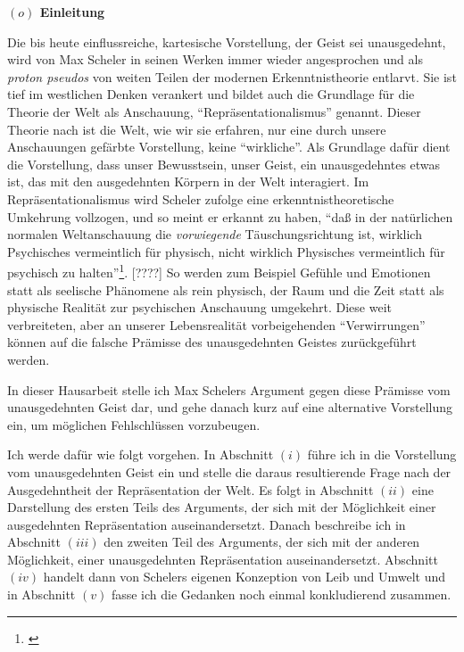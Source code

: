 \documentclass[a4paper, 12pt]{article}
\begin{document}
\begin{onehalfspace} 

\noindent\textbf{$(o)$ Einleitung}

\noindent Die bis heute einflussreiche, kartesische Vorstellung, der Geist sei unausgedehnt, wird von Max Scheler in seinen Werken immer wieder angesprochen und als \emph{proton pseudos} von weiten Teilen der modernen Erkenntnistheorie entlarvt. Sie ist tief im westlichen Denken verankert und bildet auch die Grundlage für die Theorie der Welt als Anschauung, "`Repräsentationalismus"' genannt. Dieser Theorie nach ist die Welt, wie wir sie erfahren, nur eine durch unsere Anschauungen gefärbte Vorstellung, keine "`wirkliche"'. Als Grundlage dafür dient die Vorstellung, dass unser Bewusstsein, unser Geist, ein unausgedehntes etwas ist, das mit den ausgedehnten Körpern in der Welt interagiert. Im Repräsentationalismus wird Scheler zufolge eine erkenntnistheoretische Umkehrung vollzogen, und so meint er erkannt zu haben, "`daß in der natürlichen normalen Weltanschauung die \emph{vorwiegende} Täuschungsrichtung ist, wirklich Psychisches vermeintlich für physisch, nicht wirklich Physisches vermeintlich für psychisch zu halten"'\footnote{\Cite[Siehe][S. 257]{scheler-idole}}. [????] So werden zum Beispiel Gefühle und Emotionen statt als seelische Phänomene als rein physisch, der Raum und die Zeit statt als physische Realität zur psychischen Anschauung umgekehrt. Diese weit verbreiteten, aber an unserer Lebensrealität vorbeigehenden "`Verwirrungen"' können auf die falsche Prämisse des unausgedehnten Geistes zurückgeführt werden. 

In dieser Hausarbeit stelle ich Max Schelers Argument gegen diese Prämisse vom unausgedehnten Geist dar, und gehe danach kurz auf eine alternative Vorstellung ein, um möglichen Fehlschlüssen vorzubeugen.


\vspace{3mm}
Ich werde dafür wie folgt vorgehen. In Abschnitt $(i)$ führe ich in die Vorstellung vom unausgedehnten Geist ein und stelle die daraus resultierende Frage nach der Ausgedehntheit der Repräsentation der Welt. Es folgt in Abschnitt $(ii)$ eine Darstellung des ersten Teils des Arguments, der sich mit der Möglichkeit einer ausgedehnten Repräsentation auseinandersetzt. Danach beschreibe ich in Abschnitt $(iii)$ den zweiten Teil des Arguments, der sich mit der anderen Möglichkeit, einer unausgedehnten Repräsentation auseinandersetzt. Abschnitt $(iv)$ handelt dann von Schelers eigenen Konzeption von Leib und Umwelt und in Abschnitt $(v)$ fasse ich die Gedanken noch einmal konkludierend zusammen.


\end{onehalfspace}
\end{document}
